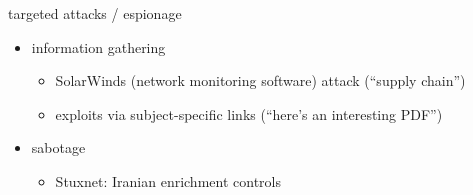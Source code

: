 \begin{frame}{targeted attacks / espionage}
    \begin{itemize}
    \item information gathering
        \begin{itemize}
        \item SolarWinds (network monitoring software) attack (``supply chain'')
        \item exploits via subject-specific links (``here's an interesting PDF'')
        \end{itemize}
    \item sabotage
        \begin{itemize}
        \item Stuxnet: Iranian enrichment controls
        \end{itemize}
    \end{itemize}
\end{frame}
